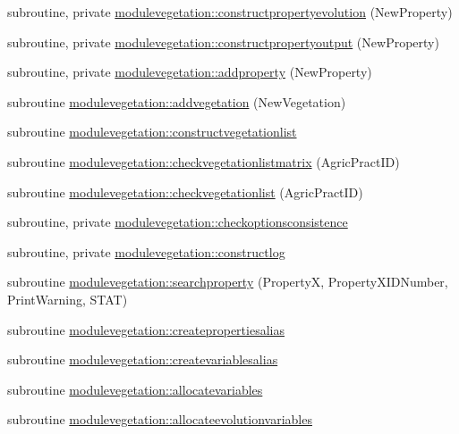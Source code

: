 \begin{DoxyCompactItemize}
\item 
subroutine, private \mbox{\hyperlink{namespacemodulevegetation_ac6177be389c51bc5c4360fab4db5d775}{modulevegetation\+::constructpropertyevolution}} (New\+Property)
\item 
subroutine, private \mbox{\hyperlink{namespacemodulevegetation_a107cf428abfe6d2909a01c200803e576}{modulevegetation\+::constructpropertyoutput}} (New\+Property)
\item 
subroutine, private \mbox{\hyperlink{namespacemodulevegetation_a1831ceef19623bbd9a0c7d167abbb20e}{modulevegetation\+::addproperty}} (New\+Property)
\item 
subroutine \mbox{\hyperlink{namespacemodulevegetation_ad22b2fa6cec4ffe4f2464f02624beca6}{modulevegetation\+::addvegetation}} (New\+Vegetation)
\item 
subroutine \mbox{\hyperlink{namespacemodulevegetation_a73de44a26d2dff28225fc8df134023fc}{modulevegetation\+::constructvegetationlist}}
\item 
subroutine \mbox{\hyperlink{namespacemodulevegetation_a487744668471d5e49ad9df7d7686866e}{modulevegetation\+::checkvegetationlistmatrix}} (Agric\+Pract\+ID)
\item 
subroutine \mbox{\hyperlink{namespacemodulevegetation_a5a2c8672adf25c28f58c08cd7f76e1c6}{modulevegetation\+::checkvegetationlist}} (Agric\+Pract\+ID)
\item 
subroutine, private \mbox{\hyperlink{namespacemodulevegetation_a0b1feb4dec9ae87423940f66f7c66f76}{modulevegetation\+::checkoptionsconsistence}}
\item 
subroutine, private \mbox{\hyperlink{namespacemodulevegetation_a9159b405f988e18f1d5dda447ae2525d}{modulevegetation\+::constructlog}}
\item 
subroutine \mbox{\hyperlink{namespacemodulevegetation_aaa44ba5345b19bc2d7499a1e5643a52e}{modulevegetation\+::searchproperty}} (PropertyX, Property\+X\+I\+D\+Number, Print\+Warning, S\+T\+AT)
\item 
subroutine \mbox{\hyperlink{namespacemodulevegetation_a6aff1147d516330fb474cb37975e7075}{modulevegetation\+::createpropertiesalias}}
\item 
subroutine \mbox{\hyperlink{namespacemodulevegetation_ae10e09bee209b569a0f021506b4bbf27}{modulevegetation\+::createvariablesalias}}
\item 
subroutine \mbox{\hyperlink{namespacemodulevegetation_a676fd58a37b84d4c65395b662dd8f0c6}{modulevegetation\+::allocatevariables}}
\item 
subroutine \mbox{\hyperlink{namespacemodulevegetation_a1a48067359829dcfe9c8335991ba78cc}{modulevegetation\+::allocateevolutionvariables}}

\end{DoxyCompactItemize}
